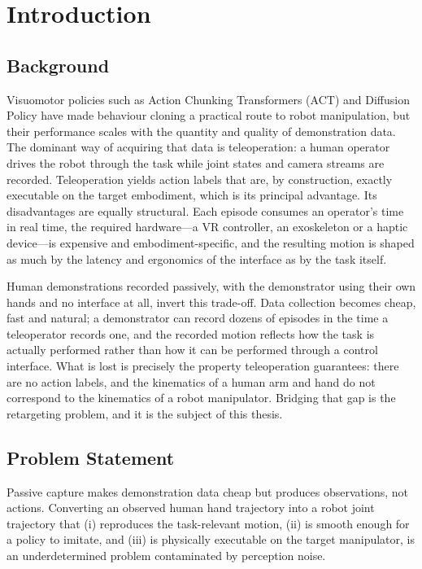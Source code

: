 \chapter{Introduction}
\label{ch:intro}

\section{Background}
\label{sec:background}

Visuomotor policies such as Action Chunking Transformers (ACT) and Diffusion
Policy have made behaviour cloning a practical route to robot manipulation, but
their performance scales with the quantity and quality of demonstration data.
The dominant way of acquiring that data is teleoperation: a human operator
drives the robot through the task while joint states and camera streams are
recorded. Teleoperation yields action labels that are, by construction, exactly
executable on the target embodiment, which is its principal advantage. Its
disadvantages are equally structural. Each episode consumes an operator's time
in real time, the required hardware---a VR controller, an exoskeleton or a
haptic device---is expensive and embodiment-specific, and the resulting motion
is shaped as much by the latency and ergonomics of the interface as by the task
itself.

Human demonstrations recorded passively, with the demonstrator using their own
hands and no interface at all, invert this trade-off. Data collection becomes
cheap, fast and natural; a demonstrator can record dozens of episodes in the
time a teleoperator records one, and the recorded motion reflects how the task
is actually performed rather than how it can be performed through a control
interface. What is lost is precisely the property teleoperation guarantees:
there are no action labels, and the kinematics of a human arm and hand do not
correspond to the kinematics of a robot manipulator. Bridging that gap is the
retargeting problem, and it is the subject of this thesis.

\section{Problem Statement}
\label{sec:problem}

Passive capture makes demonstration data cheap but produces observations, not
actions. Converting an observed human hand trajectory into a robot joint
trajectory that (i) reproduces the task-relevant motion, (ii) is smooth enough
for a policy to imitate, and (iii) is physically executable on the target
manipulator, is an underdetermined problem contaminated by perception noise.


